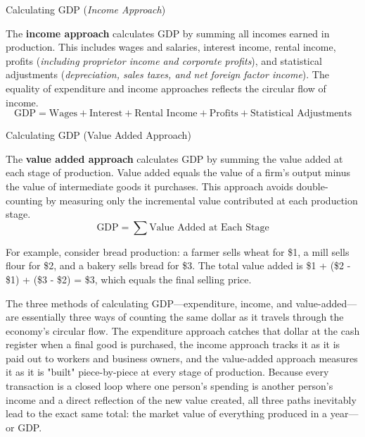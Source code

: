 \documentclass[10pt]{article}
\begin{document}
    \begin{core}{Calculating GDP (\textit{Income Approach})}

      The \textbf{income approach} calculates GDP by summing all incomes earned in production. This includes wages and salaries, interest income, rental income, profits (\textit{including proprietor income and corporate profits}), and statistical adjustments (\textit{depreciation, sales taxes, and net foreign factor income}). The equality of expenditure and income approaches reflects the circular flow of income.
      \[
        \text{GDP} = \text{Wages} + \text{Interest} + \text{Rental Income} + \text{Profits} + \text{Statistical Adjustments}
      \]

    \end{core}

    \begin{core}{Calculating GDP (Value Added Approach)}

      The \textbf{value added approach} calculates GDP by summing the value added at each stage of production. Value added equals the value of a firm's output minus the value of intermediate goods it purchases. This approach avoids double-counting by measuring only the incremental value contributed at each production stage.
      \[
        \text{GDP} = \sum \text{Value Added at Each Stage}
      \]

      For example, consider bread production: a farmer sells wheat for \$1, a mill sells flour for \$2, and a bakery sells bread for \$3. The total value added is \$1 + (\$2 - \$1) + (\$3 - \$2) = \$3, which equals the final selling price.

    \end{core}

    The three methods of calculating GDP---expenditure, income, and value-added---are essentially three ways of counting the same dollar as it travels through the economy’s circular flow. The expenditure approach catches that dollar at the cash register when a final good is purchased, the income approach tracks it as it is paid out to workers and business owners, and the value-added approach measures it as it is "built" piece-by-piece at every stage of production. Because every transaction is a closed loop where one person's spending is another person's income and a direct reflection of the new value created, all three paths inevitably lead to the exact same total: the market value of everything produced in a year---or GDP.  
\end{document}
